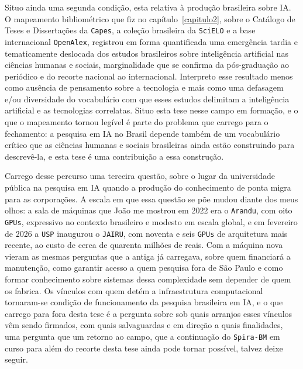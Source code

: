 Situo ainda uma segunda condição, esta relativa à produção brasileira sobre IA. O mapeamento bibliométrico que fiz no capítulo~\ref{capitulo2}, sobre o Catálogo de Teses e Dissertações da \texttt{Capes}, a coleção brasileira da \texttt{SciELO} e a base internacional \texttt{OpenAlex}, registrou em forma quantificada uma emergência tardia e tematicamente deslocada dos estudos brasileiros sobre inteligência artificial nas ciências humanas e sociais, marginalidade que se confirma da pós-graduação ao periódico e do recorte nacional ao internacional. Interpreto esse resultado menos como ausência de pensamento sobre a tecnologia e mais como uma defasagem e/ou diversidade do vocabulário com que esses estudos delimitam a inteligência artificial e as tecnologias correlatas. Situo esta tese nesse campo em formação, e o que o mapeamento tornou legível é parte do problema que carrego para o fechamento: a pesquisa em IA no Brasil depende também de um vocabulário crítico que as ciências humanas e sociais brasileiras ainda estão construindo para descrevê-la, e esta tese é uma contribuição a essa construção.

Carrego desse percurso uma terceira questão, sobre o lugar da universidade pública na pesquisa em IA quando a produção do conhecimento de ponta migra para as corporações. A escala em que essa questão se põe mudou diante dos meus olhos: a sala de máquinas que João me mostrou em 2022 era o \texttt{Arandu}, com oito \texttt{GPUs}, expressivo no contexto brasileiro e modesto em escala global, e em fevereiro de 2026 a \texttt{USP} inaugurou o \texttt{JAIRU}, com noventa e seis \texttt{GPUs} de arquitetura mais recente, ao custo de cerca de quarenta milhões de reais. Com a máquina nova vieram as mesmas perguntas que a antiga já carregava, sobre quem financiará a manutenção, como garantir acesso a quem pesquisa fora de São Paulo e como formar conhecimento sobre sistemas dessa complexidade sem depender de quem os fabrica. Os vínculos com quem detém a infraestrutura computacional tornaram-se condição de funcionamento da pesquisa brasileira em IA, e o que carrego para fora desta tese é a pergunta sobre sob quais arranjos esses vínculos vêm sendo firmados, com quais salvaguardas e em direção a quais finalidades, uma pergunta que um retorno ao campo, que a continuação do \texttt{Spira-BM} em curso para além do recorte desta tese ainda pode tornar possível, talvez deixe seguir.

